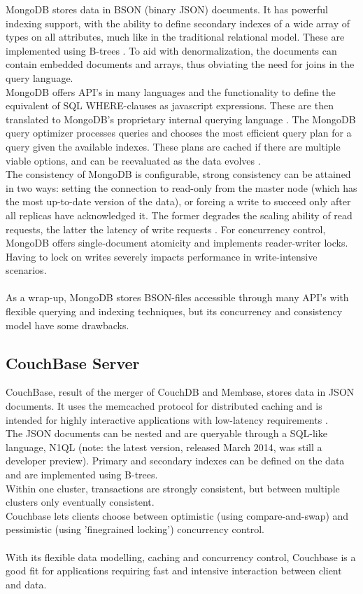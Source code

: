 \documentclass{IEEEtran}
\begin{document}
MongoDB stores data in BSON (binary JSON) documents. It has powerful indexing support, with the ability to define secondary indexes of a wide array of types on all attributes, much like in the traditional relational model. These are implemented using B-trees \cite{mongodb_indexes}. To aid with denormalization, the documents can contain embedded documents and arrays, thus obviating the need for joins in the query language.
\\MongoDB offers API's in many languages and the functionality to define the equivalent of SQL WHERE-clauses as javascript expressions. These are then translated to MongoDB's proprietary internal querying language \cite{grolinger2013data}. The MongoDB query optimizer processes queries and chooses the most efficient query plan for a query given the available indexes. These plans are cached if there are multiple viable options, and can be reevaluated as the data evolves \cite{mongodb_query_plans}.
\\The consistency of MongoDB is configurable, strong consistency can be attained in two ways: setting the connection to read-only from the master node (which has the most up-to-date version of the data), or forcing a write to succeed only after all replicas have acknowledged it. The former degrades the scaling ability of read requests, the latter the latency of write requests \cite{grolinger2013data}.
For concurrency control, MongoDB offers single-document atomicity and implements reader-writer locks. Having to lock on writes severely impacts performance in write-intensive scenarios.
\\\\As a wrap-up, MongoDB stores BSON-files accessible through many API's with flexible querying and indexing techniques, but its concurrency and consistency model have some drawbacks.

\subsection{CouchBase Server}

CouchBase, result of the merger of CouchDB and Membase, stores data in JSON documents. It uses the memcached protocol for distributed caching and is intended for highly interactive applications with low-latency requirements \cite{grolinger2013data}\cite{couchbase_about}.
\\The JSON documents can be nested and are queryable through a SQL-like language, N1QL (note: the latest version, released March 2014, was still a developer preview)\cite{couchbase_n1ql}. Primary and secondary indexes can be defined on the data and are implemented using B-trees\cite{couchbase_index}.
\\Within one cluster, transactions are strongly consistent, but between multiple clusters only eventually consistent.
\\Couchbase lets clients choose between optimistic (using compare-and-swap) and pessimistic (using 'finegrained locking') concurrency control.
\\\\With its flexible data modelling, caching and concurrency control, Couchbase is a good fit for applications requiring fast and intensive interaction between client and data.
\end{document}

